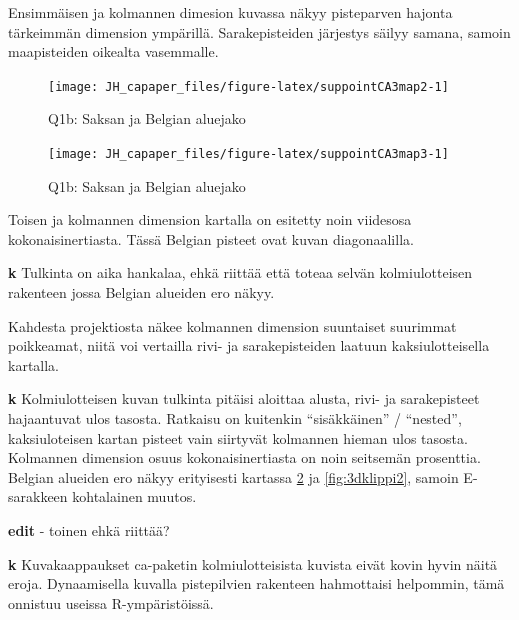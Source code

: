 \documentclass[
  finnish,
]{book}
\begin{document}
Ensimmäisen ja kolmannen dimesion kuvassa näkyy pisteparven hajonta tärkeimmän
dimension ympärillä. Sarakepisteiden järjestys säilyy samana, samoin maapisteiden
oikealta vasemmalle.

\begin{figure}

{\centering \texttt{[image: JH\_capaper\_files/figure-latex/suppointCA3map2-1]} 

}

\caption{Q1b: Saksan ja  Belgian aluejako }\label{fig:suppointCA3map2}
\end{figure}

\begin{figure}

{\centering \texttt{[image: JH\_capaper\_files/figure-latex/suppointCA3map3-1]} 

}

\caption{Q1b: Saksan ja  Belgian aluejako }\label{fig:suppointCA3map3}
\end{figure}

Toisen ja kolmannen dimension kartalla on esitetty noin viidesosa kokonaisinertiasta.
Tässä Belgian pisteet ovat kuvan diagonaalilla.

\textbf{k} Tulkinta on aika hankalaa, ehkä riittää että toteaa selvän
kolmiulotteisen rakenteen jossa Belgian alueiden ero näkyy.

Kahdesta projektiosta näkee kolmannen dimension suuntaiset suurimmat poikkeamat,
niitä voi vertailla rivi- ja sarakepisteiden laatuun kaksiulotteisella kartalla.

\textbf{k} Kolmiulotteisen kuvan tulkinta pitäisi aloittaa alusta, rivi- ja sarakepisteet
hajaantuvat ulos tasosta. Ratkaisu on kuitenkin ``sisäkkäinen'' / ``nested'', kaksiuloteisen kartan
pisteet vain siirtyvät kolmannen hieman ulos tasosta. Kolmannen dimension osuus kokonaisinertiasta
on noin seitsemän prosenttia. Belgian alueiden ero näkyy erityisesti kartassa \ref{fig:suppointCA3map3}
ja \ref{fig:3dklippi2}, samoin E-sarakkeen kohtalainen muutos.

\textbf{edit} - toinen ehkä riittää?

\textbf{k} Kuvakaappaukset ca-paketin kolmiulotteisista kuvista eivät kovin hyvin näitä eroja. Dynaamisella kuvalla pistepilvien
rakenteen hahmottaisi helpommin, tämä onnistuu useissa R-ympäristöissä.
\end{document}
